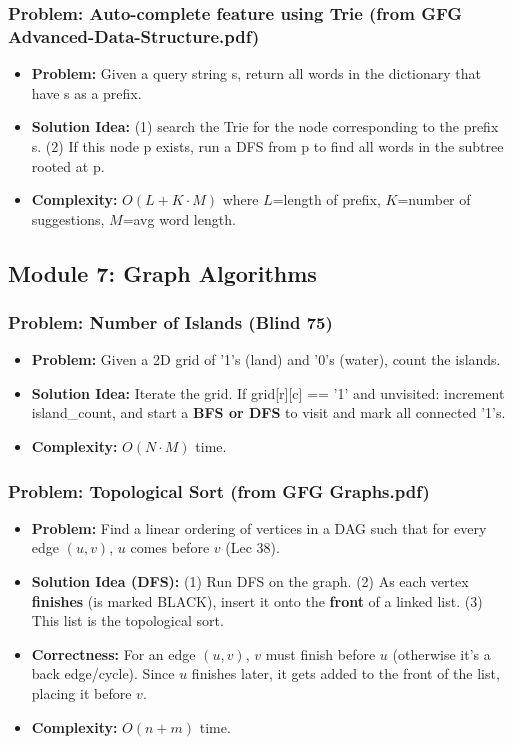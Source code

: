 \subsubsection{Problem: Auto-complete feature using Trie (from GFG Advanced-Data-Structure.pdf)}
\begin{itemize}
\item \textbf{Problem:} Given a query string s, return all words in the dictionary that have s as a prefix.
\item \textbf{Solution Idea:} (1) search the Trie for the node corresponding to the prefix s. (2) If this node p exists, run a DFS from p to find all words in the subtree rooted at p.
\item \textbf{Complexity:} $O(L + K \cdot M)$ where $L$=length of prefix, $K$=number of suggestions, $M$=avg word length.
\end{itemize}

\subsection{Module 7: Graph Algorithms}

\subsubsection{Problem: Number of Islands (Blind 75)}
\begin{itemize}
\item \textbf{Problem:} Given a 2D grid of '1's (land) and '0's (water), count the islands.
\item \textbf{Solution Idea:} Iterate the grid. If grid[r][c] == '1' and unvisited: increment island\_count, and start a \textbf{BFS or DFS} to visit and mark all connected '1's.
\item \textbf{Complexity:} $O(N \cdot M)$ time.
\end{itemize}

\subsubsection{Problem: Topological Sort (from GFG Graphs.pdf)}
\begin{itemize}
\item \textbf{Problem:} Find a linear ordering of vertices in a DAG such that for every edge $(u, v)$, $u$ comes before $v$ (Lec 38).
\item \textbf{Solution Idea (DFS):} (1) Run DFS on the graph. (2) As each vertex \textbf{finishes} (is marked BLACK), insert it onto the \textbf{front} of a linked list. (3) This list is the topological sort.
\item \textbf{Correctness:} For an edge $(u,v)$, $v$ must finish before $u$ (otherwise it's a back edge/cycle). Since $u$ finishes later, it gets added to the front of the list, placing it before $v$.
\item \textbf{Complexity:} $O(n+m)$ time.
\end{itemize}

